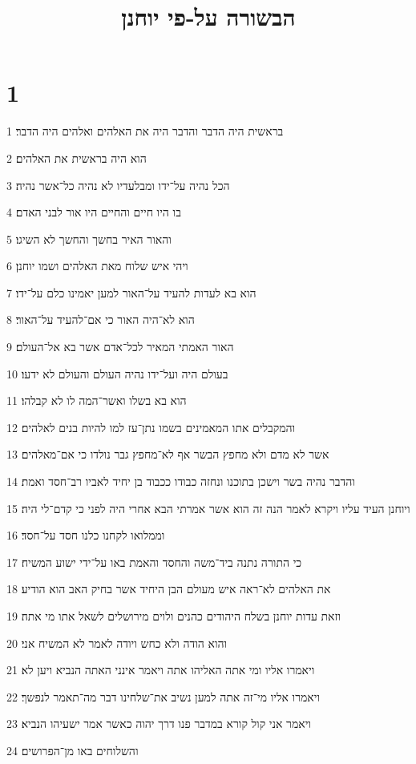 

\title{הבשורה על-פי יוחנן}


\chapter{1}

\par 1 בראשית היה הדבר והדבר היה את האלהים ואלהים היה הדבר׃
\par 2 הוא היה בראשית את האלהים׃
\par 3 הכל נהיה על־ידו ומבלעדיו לא נהיה כל־אשר נהיה׃
\par 4 בו היו חיים והחיים היו אור לבני האדם׃
\par 5 והאור האיר בחשך והחשך לא השיגו׃
\par 6 ויהי איש שלוח מאת האלהים ושמו יוחנן׃
\par 7 הוא בא לעדות להעיד על־האור למען יאמינו כלם על־ידו׃
\par 8 הוא לא־היה האור כי אם־להעיד על־האור׃
\par 9 האור האמתי המאיר לכל־אדם אשר בא אל־העולם׃
\par 10 בעולם היה ועל־ידו נהיה העולם והעולם לא ידעו׃
\par 11 הוא בא בשלו ואשר־המה לו לא קבלהו׃
\par 12 והמקבלים אתו המאמינים בשמו נתן־עז למו להיות בנים לאלהים׃
\par 13 אשר לא מדם ולא מחפץ הבשר אף לא־מחפץ גבר נולדו כי אם־מאלהים׃
\par 14 והדבר נהיה בשר וישכן בתוכנו ונחזה כבודו ככבוד בן יחיד לאביו רב־חסד ואמת׃
\par 15 ויוחנן העיד עליו ויקרא לאמר הנה זה הוא אשר אמרתי הבא אחרי היה לפני כי קדם־לי היה׃
\par 16 וממלואו לקחנו כלנו חסד על־חסד׃
\par 17 כי התורה נתנה ביד־משה והחסד והאמת באו על־ידי ישוע המשיח׃
\par 18 את האלהים לא־ראה איש מעולם הבן היחיד אשר בחיק האב הוא הודיע׃
\par 19 וזאת עדות יוחנן בשלח היהודים כהנים ולוים מירושלים לשאל אתו מי אתה׃
\par 20 והוא הודה ולא כחש ויודה לאמר לא המשיח אני׃
\par 21 ויאמרו אליו ומי אתה האליהו אתה ויאמר אינני האתה הנביא ויען לא׃
\par 22 ויאמרו אליו מי־זה אתה למען נשיב את־שלחינו דבר מה־תאמר לנפשך׃
\par 23 ויאמר אני קול קורא במדבר פנו דרך יהוה כאשר אמר ישעיהו הנביא׃
\par 24 והשלוחים באו מן־הפרושים׃
